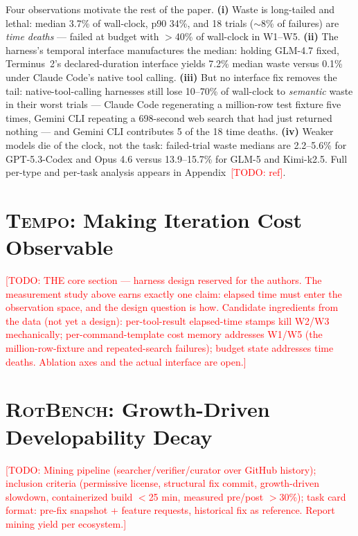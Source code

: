 \documentclass[10pt]{article}
\newcommand{\todo}[1]{\textcolor{red}{[TODO: #1]}}
\newcommand{\tempo}{\textsc{Tempo}}
\begin{document}
Four observations motivate the rest of the paper. \textbf{(i)} Waste is
long-tailed and lethal: median 3.7\% of wall-clock, p90 34\%, and 18 trials
($\sim$8\% of failures) are \emph{time deaths} --- failed at budget with
$>$40\% of wall-clock in W1--W5. \textbf{(ii)} The harness's temporal
interface manufactures the median: holding GLM-4.7 fixed, Terminus~2's
declared-duration interface yields 7.2\% median waste versus 0.1\% under
Claude Code's native tool calling. \textbf{(iii)} But no interface fix removes
the tail: native-tool-calling harnesses still lose 10--70\% of wall-clock to
\emph{semantic} waste in their worst trials --- Claude Code regenerating a
million-row test fixture five times, Gemini CLI repeating a 698-second web
search that had just returned nothing --- and Gemini CLI contributes 5 of the
18 time deaths. \textbf{(iv)} Weaker models die of the clock, not the task:
failed-trial waste medians are 2.2--5.6\% for GPT-5.3-Codex and Opus 4.6
versus 13.9--15.7\% for GLM-5 and Kimi-k2.5. Full per-type and per-task
analysis appears in Appendix~\todo{ref}.

\section{\tempo{}: Making Iteration Cost Observable}
\label{sec:tempo}

\todo{THE core section --- harness design reserved for the authors. The
measurement study above earns exactly one claim: elapsed time must enter the
observation space, and the design question is how. Candidate ingredients from
the data (not yet a design): per-tool-result elapsed-time stamps kill W2/W3
mechanically; per-command-template cost memory addresses W1/W5 (the
million-row-fixture and repeated-search failures); budget state addresses time
deaths. Ablation axes and the actual interface are open.}

\section{\textsc{RotBench}: Growth-Driven Developability Decay}
\label{sec:rotbench}

\todo{Mining pipeline (searcher/verifier/curator over GitHub history);
inclusion criteria (permissive license, structural fix commit, growth-driven
slowdown, containerized build $<$25 min, measured pre/post $>$30\%); task
card format: pre-fix snapshot + feature requests, historical fix as
reference. Report mining yield per ecosystem.}
\end{document}

